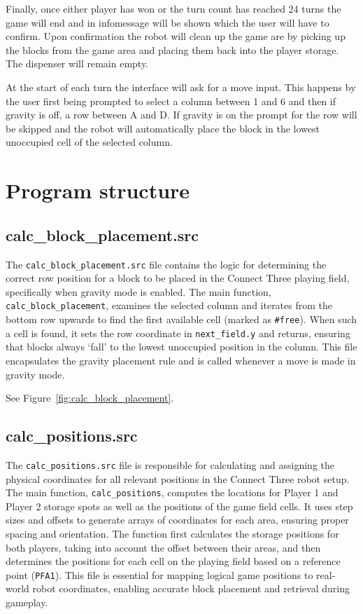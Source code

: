 \documentclass{article}
\begin{document}
        Finally, once either player has won or the turn count has reached 24 turns the game will end and in infomessage will be shown which the user will have to confirm. Upon confirmation the robot will clean up the game are by picking up the blocks from the game area and placing them back into the player storage. The dispenser will remain empty.

        At the start of each turn the interface will ask for a move input. This happens by the user first being prompted to select a column between 1 and 6 and then if gravity is off, a row between A and D. If gravity is on the prompt for the row will be skipped and the robot will automatically place the block in the lowest unoccupied cell of the selected column.
        \newpage

    \section{Program structure}
        \subsection{calc\_block\_placement.src}
            The \texttt{calc\_block\_placement.src} file contains the logic for determining the correct row position for a block to be placed in the Connect Three playing field, specifically when gravity mode is enabled. The main function, \texttt{calc\_block\_placement}, examines the selected column and iterates from the bottom row upwards to find the first available cell (marked as \texttt{\#free}). When such a cell is found, it sets the row coordinate in \texttt{next\_field.y} and returns, ensuring that blocks always `fall' to the lowest unoccupied position in the column. This file encapsulates the gravity placement rule and is called whenever a move is made in gravity mode.

            See Figure~\ref{fig:calc_block_placement}.

        \subsection{calc\_positions.src}
            The \texttt{calc\_positions.src} file is responsible for calculating and assigning the physical coordinates for all relevant positions in the Connect Three robot setup. The main function, \texttt{calc\_positions}, computes the locations for Player 1 and Player 2 storage spots as well as the positions of the game field cells. It uses step sizes and offsets to generate arrays of coordinates for each area, ensuring proper spacing and orientation. The function first calculates the storage positions for both players, taking into account the offset between their areas, and then determines the positions for each cell on the playing field based on a reference point (\texttt{PFA1}). This file is essential for mapping logical game positions to real-world robot coordinates, enabling accurate block placement and retrieval during gameplay.
\end{document}
